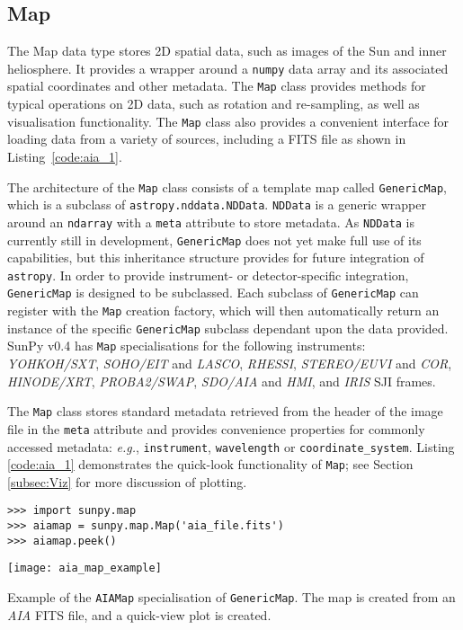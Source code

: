 \subsection{Map}\label{ssec:map}
The Map data type stores 2D spatial data, such as images of the Sun and 
inner heliosphere. It provides a wrapper around a \texttt{numpy} data array and 
its associated spatial coordinates and other metadata. The \texttt{Map} class 
provides methods for typical operations on 2D data, such as rotation and 
re-sampling, as well as visualisation functionality.
The \texttt{Map} class also provides a convenient interface for loading data 
from a variety of sources, including a FITS file as shown in 
Listing~\ref{code:aia_1}.

The architecture of the \texttt{Map} class consists of a template map called
\texttt{GenericMap}, which is a subclass of \texttt{astropy.nddata.NDData}. 
\texttt{NDData} is a generic wrapper around an \texttt{ndarray} with a 
\texttt{meta} attribute to store metadata.
As \texttt{NDData} is currently still in development, \texttt{GenericMap} does 
not yet make full use of its capabilities, but this inheritance structure 
provides for future integration of \texttt{astropy}. In order to provide 
instrument- or detector-specific integration, \texttt{GenericMap} is designed
to be subclassed. Each subclass of \texttt{GenericMap} can register 
with the \texttt{Map} creation factory, which will then automatically return an instance
of the specific \texttt{GenericMap} subclass dependant upon the data provided. 
SunPy v0.4 has \texttt{Map} specialisations for the following instruments: 
\textit{YOHKOH/SXT}, \textit{SOHO/EIT} and \textit{LASCO}, \textit{RHESSI}, 
\textit{STEREO/EUVI} and \textit{COR}, \textit{HINODE/XRT},
\textit{PROBA2/SWAP}, \textit{SDO/AIA} and \textit{HMI}, 
and \textit{IRIS} SJI frames. 

The \texttt{Map} class stores standard metadata retrieved from the header of 
the image file in the \texttt{meta} attribute and provides convenience 
properties for commonly accessed metadata: \textit{e.g.}, \texttt{instrument}, 
\texttt{wavelength} or \texttt{coordinate\_system}. 
Listing \ref{code:aia_1} demonstrates the quick-look functionality of 
\texttt{Map}; see Section \ref{subsec:Viz} for more discussion of plotting.

\begin{listing}[H]
\begin{verbatim}
>>> import sunpy.map
>>> aiamap = sunpy.map.Map('aia_file.fits')
>>> aiamap.peek()
\end{verbatim}
\begin{center}
\texttt{[image: aia\_map\_example]}
\end{center}
\caption{Example of the \texttt{AIAMap} specialisation of 
\texttt{GenericMap}. The map is created from an \textit{AIA} FITS file,
and a quick-view plot is created.}
\label{code:aia_1}
\end{listing}

